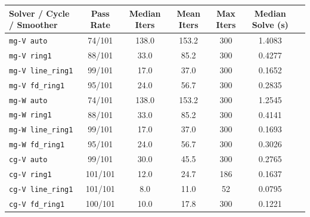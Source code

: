 \documentclass[10pt,a4paper]{article}
\begin{document}
\begin{center}
\small
\begin{tabular}{@{}lcccccc@{}}
\toprule
\textbf{Solver / Cycle / Smoother} & \textbf{Pass Rate} & \textbf{Median Iters} & \textbf{Mean Iters} & \textbf{Max Iters} & \textbf{Median Solve (s)} \\
\midrule
\texttt{mg-V auto} & 74/101 & 138.0 & 153.2 & 300 & 1.4083 \\
\texttt{mg-V ring1} & 88/101 & 33.0 & 85.2 & 300 & 0.4277 \\
\texttt{mg-V line\_ring1} & 99/101 & 17.0 & 37.0 & 300 & 0.1652 \\
\texttt{mg-V fd\_ring1} & 95/101 & 24.0 & 56.7 & 300 & 0.2835 \\
\texttt{mg-W auto} & 74/101 & 138.0 & 153.2 & 300 & 1.2545 \\
\texttt{mg-W ring1} & 88/101 & 33.0 & 85.2 & 300 & 0.4141 \\
\texttt{mg-W line\_ring1} & 99/101 & 17.0 & 37.0 & 300 & 0.1693 \\
\texttt{mg-W fd\_ring1} & 95/101 & 24.0 & 56.7 & 300 & 0.3026 \\
\texttt{cg-V auto} & 99/101 & 30.0 & 45.5 & 300 & 0.2765 \\
\texttt{cg-V ring1} & 101/101 & 12.0 & 24.7 & 186 & 0.1637 \\
\texttt{cg-V line\_ring1} & 101/101 & 8.0 & 11.0 & 52 & 0.0795 \\
\texttt{cg-V fd\_ring1} & 100/101 & 10.0 & 17.8 & 300 & 0.1221 \\
\bottomrule
\end{tabular}
\end{center}
\end{document}
